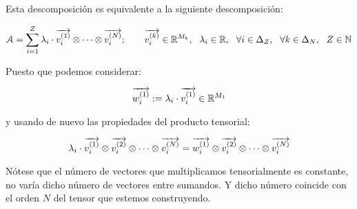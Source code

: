 \begin{observacion}
	Esta descomposición es equivalente a la siguiente descomposición:

	\begin{equation}
		\mathcal{A} = \sum_{i = 1}^Z \lambda_i \cdot \overrightarrow{v_i^{(1)}} \otimes \cdots \otimes \overrightarrow{v_i^{(N)}};
		\qquad \overrightarrow{v_i^{(k)}} \in \mathbb{R}^{M_k},
		\ \  \lambda_i \in \mathbb{R},
		\ \  \forall i \in \Delta_{Z},
		\ \  \forall k \in \Delta_{N},
		\ \  Z \in \mathbb{N}
	\end{equation}

	Puesto que podemos considerar:

	\begin{equation}
		\overrightarrow{w_i^{(1)}} := \lambda_i \cdot \overrightarrow{v_i^{(1)}} \in \mathbb{R}^{M_1}
	\end{equation}

	y usando de nuevo las propiedades del producto tensorial:

	\begin{equation}
		\lambda_i \cdot \overrightarrow{v_i^{(1)}} \otimes \overrightarrow{v_i^{(2)}} \otimes \cdots \otimes \overrightarrow{v_i^{(N)}} = \overrightarrow{w_i^{(1)}} \otimes \overrightarrow{v_i^{(2)}} \otimes \cdots \otimes  \overrightarrow{v_i^{(N)}}
	\end{equation}
\end{observacion}

\begin{observacion}
	Nótese que el número de vectores que multiplicamos tensorialmente es constante, no varía dicho número de vectores entre sumandos. Y dicho número coincide con el orden $N$ del tensor que estemos construyendo.
\end{observacion}

